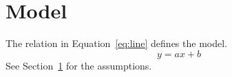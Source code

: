\documentclass{article}
\begin{document}
\section{Model}\label{sec:model}
The relation in Equation~\eqref{eq:line} defines the model.
\begin{equation}\label{eq:line}
  y = ax+b
\end{equation}
See Section~\ref{sec:model} for the assumptions.
\end{document}
